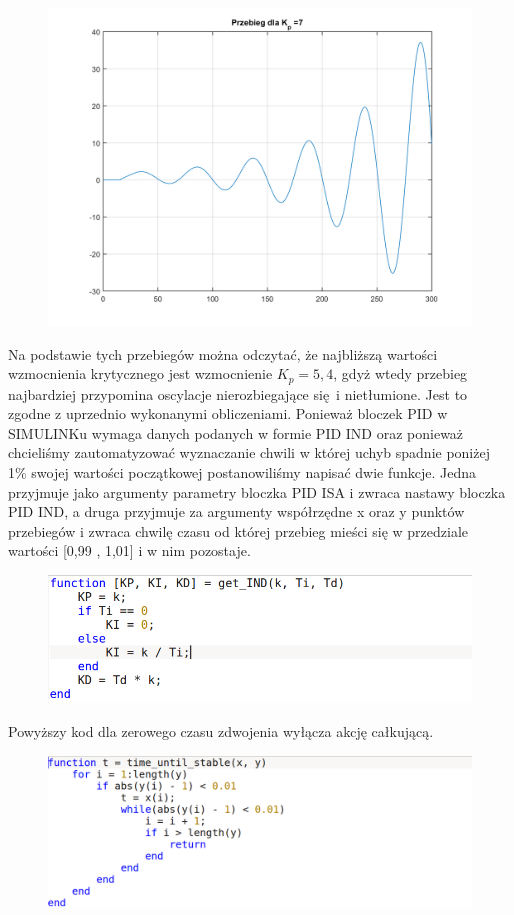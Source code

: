 \documentclass[a4paper, 12pt]{article}
\begin{document}
\begin{figure}[H]
			\includegraphics[width=0.48\linewidth]{./img/szukanie_k_7.png}
		\end{figure}
		\noindent
		Na podstawie tych przebiegów można odczytać, że najbliższą wartości wzmocnienia krytycznego jest wzmocnienie $K_p = 5,4$, gdyż wtedy przebieg najbardziej przypomina oscylacje nierozbiegające się i nietłumione. Jest to zgodne z uprzednio wykonanymi obliczeniami.
		\newline
		\newline 
		Ponieważ bloczek PID w SIMULINKu wymaga danych podanych w formie PID IND oraz ponieważ chcieliśmy zautomatyzować wyznaczanie chwili w której uchyb spadnie poniżej 1\% swojej wartości początkowej postanowiliśmy napisać dwie funkcje. Jedna przyjmuje jako argumenty parametry bloczka PID ISA i zwraca nastawy bloczka PID IND, a druga przyjmuje za argumenty współrzędne x oraz y punktów przebiegów i zwraca chwilę czasu od której przebieg mieści się w przedziale wartości [0,99 , 1,01] i w nim pozostaje.
		\begin{figure}[H]
			\includegraphics[width = \textwidth]{./code/get_IND.png}
		\end{figure}
		\noindent
		Powyższy kod dla zerowego czasu zdwojenia wyłącza akcję całkującą.
		\begin{figure}[H]
			\includegraphics[width = \textwidth]{./code/time_until_stable.png}
		\end{figure}
\end{document}
